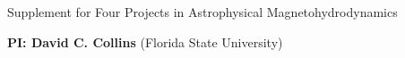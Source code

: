 \documentclass[11pt]{NSF}  %
\begin{document}
\begin{centering}
\begin{LARGE}
Supplement for Four Projects in Astrophysical Magnetohydrodynamics
\end{LARGE}


\vspace{2mm}
{\bf PI: David C. Collins} (Florida State University)

\end{centering}
\pagestyle{plain}


\def\request{151,000}
\def\forcing{\ensuremath{\eta}}
\def\mach{\ensuremath{\mathcal{M}_{S}}}
\def\xis{0}
\def\xic{1}
\def\tdyn{\ensuremath{t_{\rm{dyn}}}}
\def\Mach{\ensuremath{M_{S}}}
\def\Nu{\ensuremath{N_U}}







%


%
\end{document}
